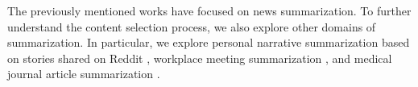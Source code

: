 

The previously mentioned works have
focused on news summarization. To further
understand the content selection process, we also explore other domains 
of summarization. In particular, we explore 
personal narrative summarization based on stories shared
on Reddit \cite{ouyang2017crowd}, workplace meeting summarization
\cite{carletta2005ami}, and medical journal article summarization 
\cite{mishra2014text}. 

